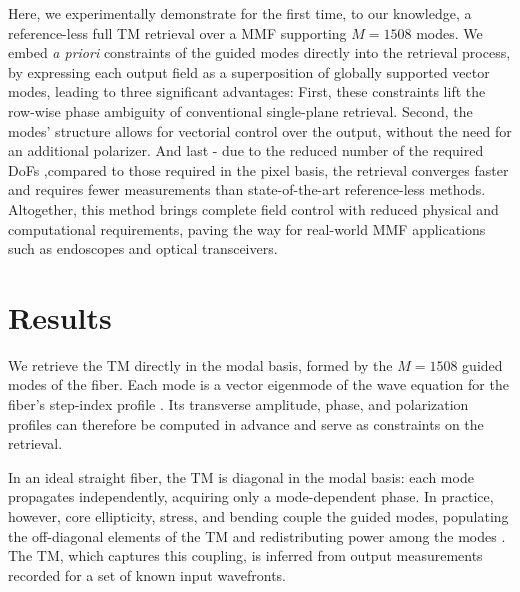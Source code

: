\documentclass{article}
\begin{document}
Here, we experimentally demonstrate for the first time, to our knowledge, a reference-less full TM retrieval over a MMF supporting $M=1508$ modes. We embed \textit{a priori} constraints of the guided modes directly into the retrieval process, by expressing each output field as a superposition of globally supported vector modes, leading to three significant advantages: First, these constraints lift the row-wise phase ambiguity of conventional single-plane retrieval. Second, the modes' structure allows for vectorial control over the output, without the need for an additional polarizer. And last - due to the reduced number of the required DoFs ,compared to those required in the pixel basis, the retrieval converges faster and requires fewer measurements than state-of-the-art reference-less methods. Altogether, this method brings complete field control with reduced physical and computational requirements, paving the way for real-world MMF applications such as endoscopes and optical transceivers.

\section{Results}
We retrieve the TM directly in the modal basis, formed by the $M=1508$ guided modes of the fiber.
Each mode is a vector eigenmode of the wave equation for the fiber's step-index profile \cite{fiber_book}.
Its transverse amplitude, phase, and polarization profiles can therefore be computed in advance and serve as constraints on the retrieval.

In an ideal straight fiber, the TM is diagonal in the modal basis: each mode propagates independently, acquiring only a mode-dependent phase.
In practice, however, core ellipticity, stress, and bending couple the guided modes, populating the off-diagonal elements of the TM and redistributing power among the modes \cite{xiong2017}.
The TM, which captures this coupling, is inferred from output measurements recorded for a set of known input wavefronts.
\end{document}
